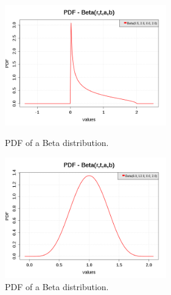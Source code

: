 \begin{figure}[H]
  \begin{minipage}{10cm}
    \begin{center}
      \includegraphics[width=7cm]{pdf_Beta_6.png}
      \caption{PDF of a Beta distribution.}
      \label{PDFBeta6}
    \end{center}
  \end{minipage}
  \hfill
  \begin{minipage}{10cm}
    \begin{center}
      \includegraphics[width=7cm]{pdf_Beta_7.png}
      \caption{PDF of a Beta distribution.}
      \label{PDFBeta7}
    \end{center}
  \end{minipage}
\end{figure}


